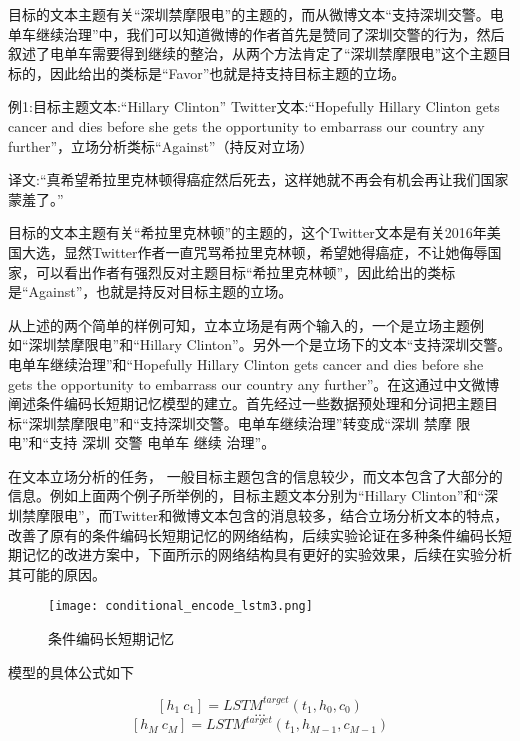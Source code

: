 目标的文本主题有关“深圳禁摩限电”的主题的，而从微博文本“支持深圳交警。电单车继续治理”中，我们可以知道微博的作者首先是赞同了深圳交警的行为，然后叙述了电单车需要得到继续的整治，从两个方法肯定了“深圳禁摩限电”这个主题目标的，因此给出的类标是“Favor”也就是持支持目标主题的立场。

例1:目标主题文本:“Hillary Clinton” Twitter文本:“Hopefully Hillary Clinton gets cancer and dies before she gets the opportunity to embarrass our country any further”，立场分析类标“Against”（持反对立场）

译文:“真希望希拉里克林顿得癌症然后死去，这样她就不再会有机会再让我们国家蒙羞了。”

目标的文本主题有关“希拉里克林顿”的主题的，这个Twitter文本是有关2016年美国大选，显然Twitter作者一直咒骂希拉里克林顿，希望她得癌症，不让她侮辱国家，可以看出作者有强烈反对主题目标“希拉里克林顿”，因此给出的类标是“Against”，也就是持反对目标主题的立场。

从上述的两个简单的样例可知，立本立场是有两个输入的，一个是立场主题例如“深圳禁摩限电”和“Hillary Clinton”。另外一个是立场下的文本“支持深圳交警。电单车继续治理”和“Hopefully Hillary Clinton gets cancer and dies before she gets the opportunity to embarrass our country any further”。在这通过中文微博阐述条件编码长短期记忆模型的建立。首先经过一些数据预处理和分词把主题目标“深圳禁摩限电”和“支持深圳交警。电单车继续治理”转变成“深圳 禁摩 限电”和“支持 深圳 交警 电单车 继续 治理”。

在文本立场分析的任务， 一般目标主题包含的信息较少，而文本包含了大部分的信息。例如上面两个例子所举例的，目标主题文本分别为“Hillary Clinton”和“深圳禁摩限电”，而Twitter和微博文本包含的消息较多，结合立场分析文本的特点，改善了原有的条件编码长短期记忆的网络结构，后续实验论证在多种条件编码长短期记忆的改进方案中，下面所示的网络结构具有更好的实验效果，后续在实验分析其可能的原因。

\begin{figure}[htbp]
	\centering
	\texttt{[image: conditional\_encode\_lstm3.png]}
	\caption[rnn_vanish]{条件编码长短期记忆}
\end{figure}

模型的具体公式如下

\begin{equation}\label{lstm_f}[h_1~c_1] = LSTM^{target}(t_1,h_0,c_0)\end{equation}
$$...$$
\begin{equation}\label{lstm_f}[h_M~c_M] = LSTM^{target}(t_1,h_{M-1},c_{M-1})\end{equation}


